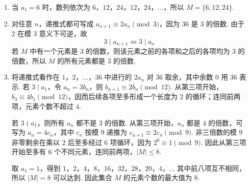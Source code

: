 \begin{solution}
\begin{enumerate}
\item 当 \(a_1=6\) 时，数列依次为 \(6\)，\(12\)，\(24\)，\(12\)，\(24\)，\(\ldots\)，所以 \(M=\{6,12,24\}\).
\item 对任意 \(n\)，递推式都可写成 \(a_{n+1}\equiv2a_n\pmod3\)，因为 \(36\) 是 \(3\) 的倍数. 由于 \(2\) 在模 \(3\) 意义下可逆，故
\[
3\mid a_{n+1}\Longleftrightarrow3\mid a_n
\]
若 \(M\) 中有一个元素是 \(3\) 的倍数，则该元素之前的各项和之后的各项均为 \(3\) 的倍数，所以 \(M\) 的所有元素都是 \(3\) 的倍数.
\item 将递推式看作在 \(1\)，\(2\)，\(\ldots\)，\(36\) 中进行的 \(2a_n\) 对 \(36\) 取余，其中余数 \(0\) 用 \(36\) 表示. 若 \(3\mid a_1\)，令 \(a_n=3b_n\)，则 \(b_{n+1}\equiv2b_n\pmod{12}\). 从第三项开始，\(b_3\equiv4b_1\pmod{12}\)，因而后续各项至多形成一个长度为 \(2\) 的循环；连同前两项，元素个数不超过 \(4\).

若 \(3\nmid a_1\)，则所有 \(a_n\) 都不是 \(3\) 的倍数. 从第三项开始，\(a_n\) 都是 \(4\) 的倍数，可写为 \(a_n=4c_n\)，其中 \(c_n\) 按模 \(9\) 递推为 \(c_{n+1}\equiv2c_n\pmod9\). 非三倍数的模 \(9\) 非零剩余在乘以 \(2\) 后至多经过 \(6\) 项循环，因为 \(2^6\equiv1\pmod9\). 因此从第三项开始至多有 \(6\) 个不同元素，连同前两项，\(|M|\leqslant8\).

取 \(a_1=1\)，得到
\(1\)，\(2\)，\(4\)，\(8\)，\(16\)，\(32\)，\(28\)，\(20\)，\(4\)，\(\ldots\)
其中前八项互不相同，所以 \(|M|=8\) 可以达到. 因此集合 \(M\) 的元素个数的最大值为 \(8\).
\end{enumerate}
\end{solution}
